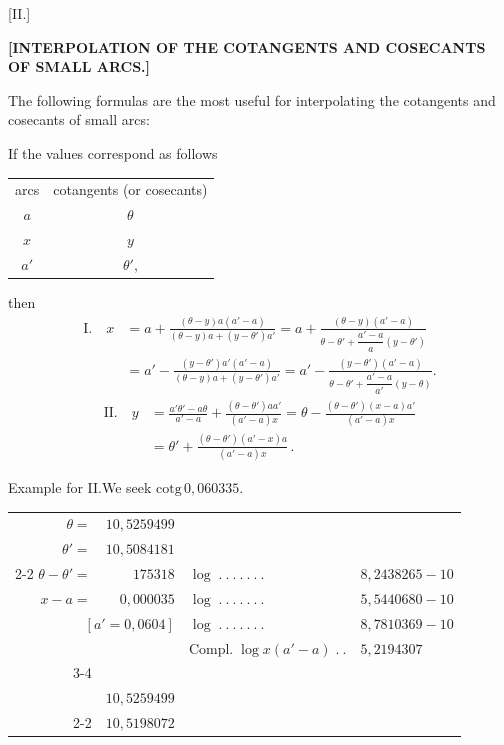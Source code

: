 \clearpage{}
\begin{center}
[II.]

\medskip
\textbf{[INTERPOLATION OF THE COTANGENTS AND COSECANTS OF SMALL ARCS.]}
\end{center}

The following formulas are the most useful for interpolating the cotangents
and cosecants of small arcs:

If the values correspond as follows
\begin{center}
\begin{tabular}{cc}
arcs & cotangents (or cosecants) \\
$a$ & $\theta$ \\
$x$ & $y$ \\
$a'$ & $\theta'$, \\
\end{tabular}
\end{center}
then
\[
\begin{aligned}
\mathrm{I.}\quad x &= a+\frac{(\theta-y)a(a'-a)}{(\theta-y)a+(y-\theta')a'}
=a+\frac{(\theta-y)(a'-a)}{\theta-\theta'+\dfrac{a'-a}{a}(y-\theta')}\\[5pt]
&=a'-\frac{(y-\theta')a'(a'-a)}{(\theta-y)a+(y-\theta')a'}
=a'-\frac{(y-\theta')(a'-a)}{\theta-\theta'+\dfrac{a'-a}{a'}(y-\theta)}.
\end{aligned}
\]
\[
\begin{aligned}
\mathrm{II.}\quad y&=\frac{a'\theta'-a\theta}{a'-a}+\frac{(\theta-\theta')aa'}{(a'-a)x}
=\theta-\frac{(\theta-\theta')(x-a)a'}{(a'-a)x}\\[5pt]
&=\theta'+\frac{(\theta-\theta')(a'-x)a}{(a'-a)x}\,.
\end{aligned}
\]

Example for II.\quad We seek $\mathrm{cotg}\,0{,}060335$.
\begin{center}\small
\begin{tabular}{r@{\;}r@{\quad}l@{\;}l}
$\theta=$ & $10{,}5259499$ &&\\
$\theta'=$ & $10{,}5084181$ &&\\\cline{2-2}
$\theta-\theta'=$ & $175318$ & $\log\; .\ .\ .\ .\ .\ .\ .$ & $8{,}2438265-10$\\
$x-a=$ & $0{,}000035$ & $\log\; .\ .\ .\ .\ .\ .\ .$ & $5{,}5440680-10$\\
\multicolumn{2}{r}{$[a'=0{,}0604]$} & $\log\; .\ .\ .\ .\ .\ .\ .$ & $8{,}7810369-10$\\
&& $\mathrm{Compl.}\;\log x(a'-a)\; .\ .$ & $5{,}2194307$\\\cline{3-4}
\multicolumn{4}{r}{$0{,}00614274\; .\ .\ .\ .\ .\ .\ .\ .\ .\ .\ .\ .\ .\ .\ .\ .\ .\ .\ .\ .\;7{,}7883621-10$}\\
&$10{,}5259499$&&\\\cline{2-2}
&$10{,}5198072$&&
\end{tabular}
\end{center}
